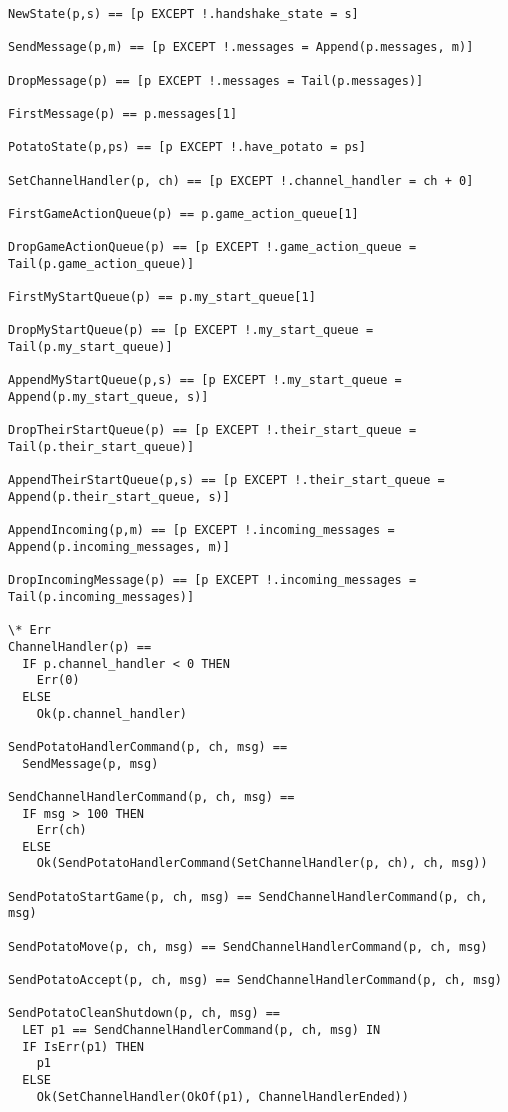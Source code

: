 \documentclass[a4paper]{article}
\begin{document}
\begin{multicols}{2}
\begin{verbatim}
NewState(p,s) == [p EXCEPT !.handshake_state = s]

SendMessage(p,m) == [p EXCEPT !.messages = Append(p.messages, m)]

DropMessage(p) == [p EXCEPT !.messages = Tail(p.messages)]

FirstMessage(p) == p.messages[1]

PotatoState(p,ps) == [p EXCEPT !.have_potato = ps]

SetChannelHandler(p, ch) == [p EXCEPT !.channel_handler = ch + 0]

FirstGameActionQueue(p) == p.game_action_queue[1]

DropGameActionQueue(p) == [p EXCEPT !.game_action_queue = Tail(p.game_action_queue)]

FirstMyStartQueue(p) == p.my_start_queue[1]

DropMyStartQueue(p) == [p EXCEPT !.my_start_queue = Tail(p.my_start_queue)]

AppendMyStartQueue(p,s) == [p EXCEPT !.my_start_queue = Append(p.my_start_queue, s)]

DropTheirStartQueue(p) == [p EXCEPT !.their_start_queue = Tail(p.their_start_queue)]

AppendTheirStartQueue(p,s) == [p EXCEPT !.their_start_queue = Append(p.their_start_queue, s)]

AppendIncoming(p,m) == [p EXCEPT !.incoming_messages = Append(p.incoming_messages, m)]

DropIncomingMessage(p) == [p EXCEPT !.incoming_messages = Tail(p.incoming_messages)]

\* Err
ChannelHandler(p) ==
  IF p.channel_handler < 0 THEN
    Err(0)
  ELSE
    Ok(p.channel_handler)

SendPotatoHandlerCommand(p, ch, msg) ==
  SendMessage(p, msg)

SendChannelHandlerCommand(p, ch, msg) ==
  IF msg > 100 THEN
    Err(ch)
  ELSE
    Ok(SendPotatoHandlerCommand(SetChannelHandler(p, ch), ch, msg))

SendPotatoStartGame(p, ch, msg) == SendChannelHandlerCommand(p, ch, msg)
  
SendPotatoMove(p, ch, msg) == SendChannelHandlerCommand(p, ch, msg)

SendPotatoAccept(p, ch, msg) == SendChannelHandlerCommand(p, ch, msg)

SendPotatoCleanShutdown(p, ch, msg) ==
  LET p1 == SendChannelHandlerCommand(p, ch, msg) IN
  IF IsErr(p1) THEN
    p1
  ELSE
    Ok(SetChannelHandler(OkOf(p1), ChannelHandlerEnded))


\end{verbatim}
\end{multicols}
\end{document}
